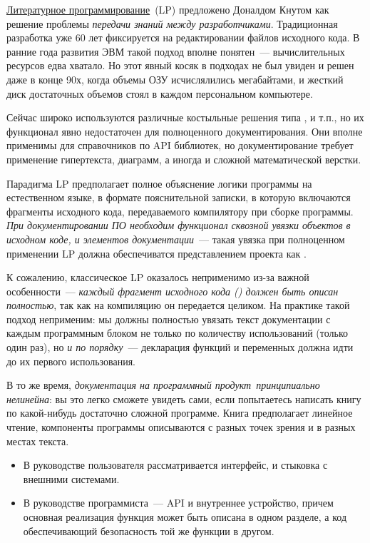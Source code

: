\clearpage
{}\label{litprog}

\href{https://en.wikipedia.org/wiki/Literate_programming}{Литературное
программирование}\ (LP) предложено Доналдом Кнутом как решение проблемы
\emph{передачи знаний между разработчиками}. Традиционная разработка уже 60 лет
фиксируется на редактировании файлов исходного кода. В ранние года развития ЭВМ
такой подход вполне понятен\ --- вычислительных ресурсов едва хватало. Но этот
явный косяк в подходах не был увиден и решен даже в конце 90х, когда объемы
ОЗУ исчислялились мегабайтами, и жесткий диск достаточных объемов стоял в каждом
персональном компьютере.

Сейчас широко используются различные костыльные решения типа ,
 и т.п., но их функционал явно недостаточен для полноценного
документирования. Они вполне применимы для справочников по API библиотек, но
документирование требует применение гипертекста, диаграмм, а иногда и сложной
математической верстки.

Парадигма LP предполагает полное объяснение логики программы на естественном
языке, в формате пояснительной записки, в которую включаются фрагменты исходного
кода, передаваемого компилятору при сборке программы. \emph{При документировании
ПО необходим функционал сквозной увязки объектов в исходном коде, и элементов
документации}\ --- такая увязка при полноценном применении LP должна
обеспечиватся представлением проекта как .

К сожалению, классическое LP оказалось неприменимо из-за важной особенности\ ---
\emph{каждый фрагмент исходного кода () должен быть описан
полностью}, так как на компиляцию он передается целиком. На практике такой
подход неприменим: мы должны полностью увязать текст документации с каждым
программным блоком не только по количеству использований (только один раз), но
\emph{и по порядку}\ --- декларация функций и переменных должна идти до их
первого использования.

В то же время, \emph{документация на программный продукт\ принципиально нелинейна}: вы это легко сможете
увидеть сами, если попытаетесь написать книгу по какой-нибудь достаточно сложной
программе. Книга предполагает линейное чтение, компоненты программы описываются
с разных точек зрения и в разных местах текста.
\begin{itemize}[nosep]
\item
В руководстве пользователя рассматривается интерфейс, и стыковка с внешними
системами.
\item
В руководстве программиста\ --- API и внутреннее устройство, причем основная
реализация функция может быть описана в одном разделе, а код обеспечивающий
безопасность той же функции в другом.
\end{itemize}

